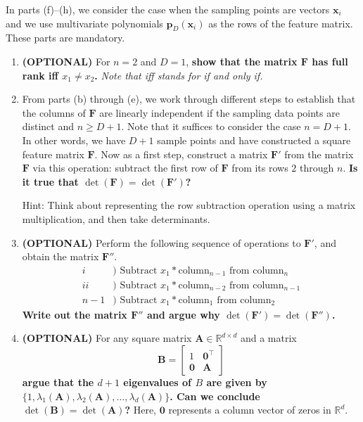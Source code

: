 \documentclass{article}\usepackage[utf8]{inputenc}\usepackage[margin=0.4cm,top=0.4cm,bottom=0.4cm]{geometry}\usepackage[usenames,dvipsnames,svgnames,table]{xcolor}
\begin{document}
\noindent In parts (f)--(h), we consider the case when the sampling points are vectors $\mathbf{x}_i$ and we use multivariate polynomials $\mathbf{p}_D(\mathbf{x}_i)$ as the rows of the feature matrix. These parts are mandatory.
\begin{enumerate}
\item \textbf{(OPTIONAL)} For $n = 2$ and $D=1$, \textbf{show that the matrix $\mathbf{F}$ has full rank iff $x_1 \neq x_2$.} \textit{Note that iff stands for if and only if.}
\BeginSolution

\EndSolution
\item From parts (b) through (e), we work through different steps to establish that the columns of $\mathbf{F}$ are linearly independent if the sampling data points are distinct and $n \geqslant D+1$. Note that it suffices to consider the case $n=D+1$. In other words, we have $D+1$ sample points and have constructed a square feature matrix $\mathbf{F}$. Now as a first step, construct a matrix $\mathbf{F}'$ from the matrix $\mathbf{F}$ via this operation: subtract the first row of $\mathbf{F}$ from its rows $2$ through $n$. \textbf{Is it true that $\det(\mathbf{F}) = \det(\mathbf{F}')$?}
\vspace{4pt}

Hint: Think about representing the row subtraction operation using a matrix multiplication, and then take determinants.
\BeginSolution

\EndSolution
\item \textbf{(OPTIONAL)} Perform the following sequence of operations to $\mathbf{F}'$, and obtain the matrix $\mathbf{F}''$.
\begin{align*}i&) \text{ Subtract } x_1*\text{column}_{n-1}\text{ from }\text{column}_n \\ii&) \text{ Subtract } x_1*\text{column}_{n-2}\text{ from }\text{column}_{n-1} \\ n-1&) \text{ Subtract } x_1*\text{column}_{1}\text{ from }\text{column}_2\end{align*} \textbf{Write out the matrix $\mathbf{F}''$ and argue why $\det(\mathbf{F}') = \det(\mathbf{F}'')$.}
\BeginSolution

\EndSolution
\item \textbf{(OPTIONAL)} For any square matrix $\mathbf{A} \in \mathbb{R}^{d \times d}$ and a matrix $$\mathbf{B} = \left[\begin{array}{cc}1 & \mathbf{0}^\top \\ \mathbf{0} & \mathbf{A}\end{array}\right]$$ \textbf{argue that the $d+1$ eigenvalues of $B$ are given by $\{1, \lambda_1(\mathbf{A} ), \lambda_2(\mathbf{A} ), \ldots, \lambda_d(\mathbf{A} )\}$. Can we conclude $\det(\mathbf{B}) = \det(\mathbf{A})$?} Here, ${\mathbf{0}}$ represents a column vector of zeros in $\mathbb{R}^d$.
\BeginSolution


\end{enumerate}
\end{document}
